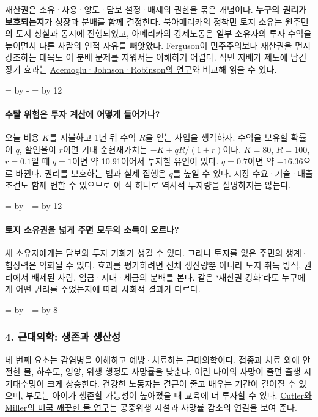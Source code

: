 \documentclass[10pt,a4paper]{article}
\newcommand{\ReserveQuestionSpace}{%
  \par\begingroup
  \dimen0=\pagegoal \advance\dimen0 by -\pagetotal
  \dimen2=\baselineskip \multiply\dimen2 by 12
  \ifdim\dimen0<\dimen2 \newpage\fi
  \endgroup}
\newcommand{\ReserveReadingSectionSpace}{%
  \par\begingroup
  \dimen0=\pagegoal \advance\dimen0 by -\pagetotal
  \dimen2=\baselineskip \multiply\dimen2 by 8
  \ifdim\dimen0<\dimen2 \newpage\fi
  \endgroup}
\begin{document}
재산권은 소유·사용·양도·담보 설정·배제의 권한을 묶은 개념이다. \textbf{누구의 권리가 보호되는지}가 성장과 분배를 함께 결정한다. 북아메리카의 정착민 토지 소유는 원주민의 토지 상실과 동시에 진행되었고, 아메리카의 강제노동은 일부 소유자의 투자 수익을 높이면서 다른 사람의 인적 자유를 빼앗았다. Ferguson이 민주주의보다 재산권을 먼저 강조하는 대목도 이 분배 문제를 지워서는 이해하기 어렵다. 식민 지배가 제도에 남긴 장기 효과는 \href{https://www.aeaweb.org/articles?id=10.1257\%2Faer.91.5.1369}{Acemoglu·Johnson·Robinson의 연구}와 비교해 읽을 수 있다.\par

\ReserveQuestionSpace
\paragraph{수탈 위험은 투자 계산에 어떻게 들어가나?}
오늘 비용 $K$를 지불하고 1년 뒤 수익 $R$을 얻는 사업을 생각하자. 수익을 보유할 확률이 $q$, 할인율이 $r$이면 기대 순현재가치는 $-K+qR/(1+r)$이다. $K=80$, $R=100$, $r=0.1$일 때 $q=1$이면 약 10.91이어서 투자할 유인이 있다. $q=0.7$이면 약 $-16.36$으로 바뀐다. 권리를 보호하는 법과 실제 집행은 $q$를 높일 수 있다. 시장 수요·기술·대출 조건도 함께 변할 수 있으므로 이 식 하나로 역사적 투자량을 설명하지는 않는다.\par

\ReserveQuestionSpace
\paragraph{토지 소유권을 넓게 주면 모두의 소득이 오르나?}
새 소유자에게는 담보와 투자 기회가 생길 수 있다. 그러나 토지를 잃은 주민의 생계·협상력은 악화될 수 있다. 효과를 평가하려면 전체 생산량뿐 아니라 토지 취득 방식, 권리에서 배제된 사람, 임금·지대·세금의 분배를 본다. 같은 ‘재산권 강화’라도 누구에게 어떤 권리를 주었는지에 따라 사회적 결과가 다르다.\par

\ReserveReadingSectionSpace
\subsubsection*{4. 근대의학: 생존과 생산성}

네 번째 요소는 감염병을 이해하고 예방·치료하는 근대의학이다. 접종과 치료 외에 안전한 물, 하수도, 영양, 위생 행정도 사망률을 낮춘다. 어린 나이의 사망이 줄면 출생 시 기대수명이 크게 상승한다. 건강한 노동자는 결근이 줄고 배우는 기간이 길어질 수 있으며, 부모는 아이가 생존할 가능성이 높아졌을 때 교육에 더 투자할 수 있다. \href{https://www.nber.org/papers/w10511}{Cutler와 Miller의 미국 깨끗한 물 연구}는 공중위생 시설과 사망률 감소의 연결을 보여 준다.\par
\end{document}
